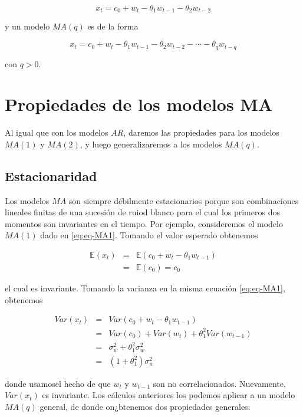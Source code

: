 \documentclass[12pt,]{krantz}
\theoremstyle{definition}
\theoremstyle{definition}
\theoremstyle{definition}
\theoremstyle{remark}
\begin{document}
\begin{equation}
x_t=c_0+w_t-\theta_1w_{t-1}-\theta_2w_{t-2}
\label{eq:eq-MA2}
\end{equation}

y un modelo \(MA(q)\) es de la forma

\begin{equation}
x_t=c_0+w_t-\theta_1w_{t-1}-\theta_2w_{t-2}-\cdots-\theta_qw_{t-q}
\label{eq:eq-MAq-2}
\end{equation}

con \(q>0\).

\section{Propiedades de los modelos
MA}\label{propiedades-de-los-modelos-ma}

Al igual que con los modelos \(AR\), daremos las propiedades para los
modelos \(MA(1)\) y \(MA(2)\), y luego generalizaremos a los modelos
\(MA(q)\).

\subsection{Estacionaridad}\label{estacionaridad}

Los modelos \(MA\) son siempre débilmente estacionarios porque son
combinaciones lineales finitas de una sucesión de ruiod blanco para el
cual los primeros dos momentos son invariantes en el tiempo. Por
ejemplo, consideremos el modelo \(MA(1)\) dado en \eqref{eq:eq-MA1}.
Tomando el valor esperado obtenemos

\begin{eqnarray*}
\mathbb{E}(x_t) &=& \mathbb{E}(c_0+w_t-\theta_1w_{t-1}) \\
                &=& \mathbb{E}(c_0) = c_0
\end{eqnarray*}

el cual es invariante. Tomando la varianza en la misma ecuación
\eqref{eq:eq-MA1}, obtenemos

\begin{eqnarray*}
Var(x_t) &=& Var(c_0+w_t-\theta_1w_{t-1}) \\
         &=& Var(c_0)+Var(w_t)+\theta_1^2Var(w_{t-1}) \\
         &=& \sigma_w^2+\theta_1^2\sigma_w^2 \\
         &=& (1+\theta_1^2)\sigma_w^2
\end{eqnarray*}

donde usamosel hecho de que \(w_t\) y \(w_{t-1}\) son no
correlacionados. Nuevamente, \(Var(x_t)\) es invariante. Los cálculos
anteriores los podemos aplicar a un modelo \(MA(q)\) general, de donde
on¿btenemos dos propiedades generales:
\end{document}
